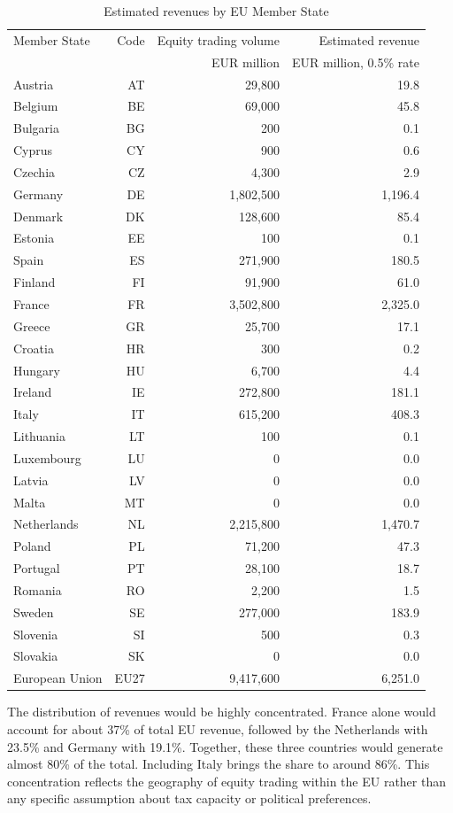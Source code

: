 \documentclass[../main]{subfiles}
\begin{document}
\begin{longtable}{lrrr}
\caption{Estimated revenues by EU Member State}
\label{tab:revenues_member_states}\\
\hline
Member State & Code & Equity trading volume & Estimated revenue \\
             &      & EUR million & EUR million, 0.5\% rate \\
\hline
Austria & AT & 29,800 & 19.8 \\
Belgium & BE & 69,000 & 45.8 \\
Bulgaria & BG & 200 & 0.1 \\
Cyprus & CY & 900 & 0.6 \\
Czechia & CZ & 4,300 & 2.9 \\
Germany & DE & 1,802,500 & 1,196.4 \\
Denmark & DK & 128,600 & 85.4 \\
Estonia & EE & 100 & 0.1 \\
Spain & ES & 271,900 & 180.5 \\
Finland & FI & 91,900 & 61.0 \\
France & FR & 3,502,800 & 2,325.0 \\
Greece & GR & 25,700 & 17.1 \\
Croatia & HR & 300 & 0.2 \\
Hungary & HU & 6,700 & 4.4 \\
Ireland & IE & 272,800 & 181.1 \\
Italy & IT & 615,200 & 408.3 \\
Lithuania & LT & 100 & 0.1 \\
Luxembourg & LU & 0 & 0.0 \\
Latvia & LV & 0 & 0.0 \\
Malta & MT & 0 & 0.0 \\
Netherlands & NL & 2,215,800 & 1,470.7 \\
Poland & PL & 71,200 & 47.3 \\
Portugal & PT & 28,100 & 18.7 \\
Romania & RO & 2,200 & 1.5 \\
Sweden & SE & 277,000 & 183.9 \\
Slovenia & SI & 500 & 0.3 \\
Slovakia & SK & 0 & 0.0 \\
\hline
European Union & EU27 & 9,417,600 & 6,251.0 \\
\hline
\end{longtable}


The distribution of revenues would be highly concentrated. France alone would account for about 37\% of total EU revenue, followed by the Netherlands with 23.5\% and Germany with 19.1\%. Together, these three countries would generate almost 80\% of the total. Including Italy brings the share to around 86\%. This concentration reflects the geography of equity trading within the EU rather than any specific assumption about tax capacity or political preferences.
\end{document}
